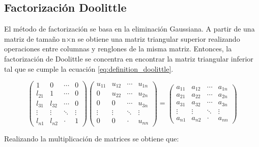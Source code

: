 \subsection{Factorización Doolittle}

El método de factorización se basa en la eliminación Gaussiana. A partir de una matriz de tamaño n$\times$n se obtiene una matriz triangular superior realizando operaciones entre columnas y renglones de la misma matriz. Entonces, la factorización de Doolittle se concentra en encontrar la matriz triangular inferior tal que se cumple la ecuación \ref{eq:definition_doolittle}.

\begin{equation}
    \begin{pmatrix}
        1      & 0      & \cdots & 0      \\
        l_{21} & 1      & \cdots & 0      \\
        l_{31} & l_{32} & \cdots & 0      \\
        \vdots & \vdots & \ddots & \vdots \\
        l_{n1} & l_{n2} & \cdot  & 1
    \end{pmatrix}
    \begin{pmatrix}
        u_{11} & u_{12} & \cdots & u_{1n} \\
        0      & u_{22} & \cdots & u_{2n} \\
        0      & 0      & \cdots & u_{3n} \\
        \vdots & \vdots & \ddots & \vdots \\
        0      & 0      & \cdot  & u_{nn}
    \end{pmatrix}=
    \begin{pmatrix}
        a_{11} & a_{12} & \cdots & a_{1n} \\
        a_{21} & a_{22} & \cdots & a_{2n} \\
        a_{31} & a_{32} & \cdots & a_{3n} \\
        \vdots & \vdots & \ddots & \vdots \\
        a_{n1} & a_{n2} & \cdot  & a_{nn}
    \end{pmatrix}
    \label{eq:definition_doolittle}
\end{equation}

Realizando la multiplicación de matrices se obtiene que:

